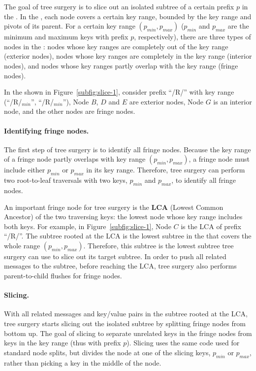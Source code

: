 The goal of tree surgery is to slice out an isolated subtree of a certain
prefix $p$ in the \bet.
In the \bet, each node covers a certain key range, bounded by the key range and
pivots of its parent.
For a certain key range $(p_{min}, p_{max})$ ($p_{min}$ and $p_{max}$ are the
minimum and maximum keys with prefix $p$, respectively), there are three types
of nodes in the \bet:
nodes whose key ranges are completely out of the key range (exterior nodes),
nodes whose key ranges are completely in the key range (interior nodes),
and nodes whose key ranges partly overlap with the key range (fringe nodes).

In the \bet shown in Figure~\ref{subfig:slice-1},
consider prefix ``/R/'' with key range (``/R/$_{min}$'', ``/R/$_{min}$''),
Node $B$, $D$ and $E$ are exterior nodes, Node $G$ is an interior node,
and the other nodes are fringe nodes.

\paragraph{Identifying fringe nodes.}
The first step of tree surgery is to identify all fringe nodes.
Because the key range of a fringe node partly overlaps with key range
$(p_{min}, p_{max})$,
a fringe node must include either $p_{min}$ or $p_{max}$ in its key range.
Therefore, tree surgery can perform two root-to-leaf traversals with two keys,
$p_{min}$ and $p_{max}$, to identify all fringe nodes.

An important fringe node for tree surgery is the \textbf{LCA}
(Lowest Common Ancestor) of the two traversing keys: the lowest \bet node
whose key range includes both keys.
For example, in Figure~\ref{subfig:slice-1}, Node $C$ is the LCA of prefix
``/R/''.
The subtree rooted at the LCA is the lowest subtree in the \bet that covers
the whole range $(p_{min}, p_{max})$.
Therefore, this subtree is the lowest subtree tree surgery can use to slice out
its target subtree.
In order to push all related messages to the subtree, before reaching the LCA,
tree surgery also performs parent-to-child flushes for fringe nodes.

\paragraph{Slicing.}
With all related messages and key/value pairs in the subtree rooted at the LCA,
tree surgery starts slicing out the isolated subtree
by splitting fringe nodes from bottom up.
The goal of slicing to separate unrelated keys in the fringe nodes
from keys in the key range (thus with prefix $p$).
Slicing uses the same code used for standard \bet node splits, but
divides the node at one of the slicing keys, $p_{min}$ or $p_{max}$, rather than
picking a key in the middle of the node.

